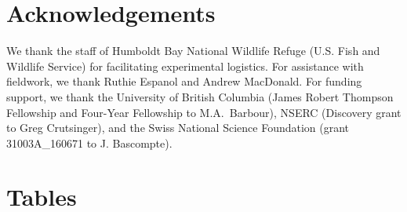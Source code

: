 \documentclass[11pt,]{article}
\begin{document}
\section{Acknowledgements}\label{acknowledgements}

We thank the staff of Humboldt Bay National Wildlife Refuge (U.S. Fish
and Wildlife Service) for facilitating experimental logistics. For
assistance with fieldwork, we thank Ruthie Espanol and Andrew MacDonald.
For funding support, we thank the University of British Columbia (James
Robert Thompson Fellowship and Four-Year Fellowship to M.A.~Barbour),
NSERC (Discovery grant to Greg Crutsinger), and the Swiss National
Science Foundation (grant 31003A\_160671 to J. Bascompte).

\newpage 

\section{Tables}\label{tables}

\newpage 
\end{document}
